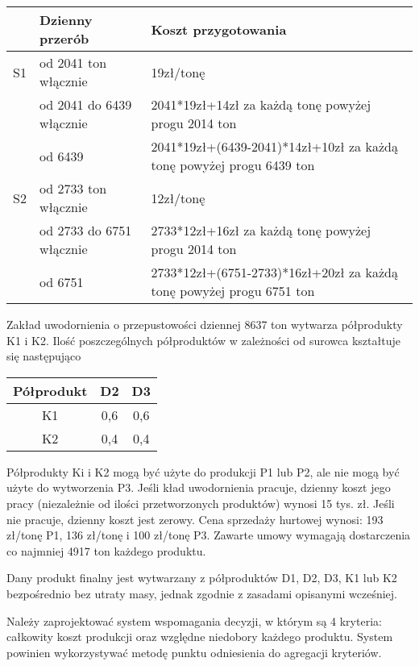 \documentclass[a4paper, 10pt]{article}
\begin{document}
\begin{center}
    \begin{tabular}{ | l | l | l |}
    \hline
    & Dzienny przerób & Koszt przygotowania \\ \hline
	S1 & od 2041 ton włącznie & 19zł/tonę \\ \hline
	& od 2041 do 6439 włącznie & 2041*19zł+14zł za każdą tonę powyżej progu 2014 ton \\ \hline
	& od 6439 & 2041*19zł+(6439-2041)*14zł+10zł za każdą tonę powyżej progu 6439 ton \\ \hline
	S2 & od 2733 ton włącznie & 12zł/tonę \\ \hline
	& od 2733 do 6751 włącznie & 2733*12zł+16zł za każdą tonę powyżej progu 2014 ton \\ \hline
	& od 6751 & 2733*12zł+(6751-2733)*16zł+20zł za każdą tonę powyżej progu 6751 ton \\ \hline
    \end{tabular}
\end{center}



Zakład uwodornienia o przepustowości dziennej 8637 ton wytwarza półprodukty K1 i K2. Ilość poszczególnych półproduktów w zależności od surowca kształtuje się następująco



\begin{center}
    \begin{tabular}{ | c | c | c |}
    \hline
    Półprodukt & D2 & D3 \\ \hline
	K1 & 0,6 & 0,6 \\ \hline
	K2 & 0,4 & 0,4 \\ \hline
    \end{tabular}
\end{center}


Półprodukty Ki i K2 mogą być użyte do produkcji P1 lub P2, ale nie mogą być użyte do wytworzenia P3. Jeśli 
kład uwodornienia pracuje, dzienny koszt jego pracy (niezależnie od ilości przetworzonych produktów) wynosi
15 tys. zł. Jeśli nie pracuje, dzienny koszt jest zerowy. Cena sprzedaży hurtowej wynosi: 193 zł/tonę P1, 136 zł/tonę i
100 zł/tonę P3. Zawarte umowy wymagają dostarczenia co najmniej 4917 ton każdego produktu.

Dany produkt finalny jest wytwarzany z półproduktów D1, D2, D3, K1 lub K2 bezpośrednio bez utraty masy, jednak zgodnie
z zasadami opisanymi wcześniej.

Należy zaprojektować system wspomagania decyzji, w którym są 4 kryteria: całkowity koszt produkcji oraz względne niedobory
każdego produktu. System powinien wykorzystywać metodę punktu odniesienia do agregacji kryteriów.
\end{document}
